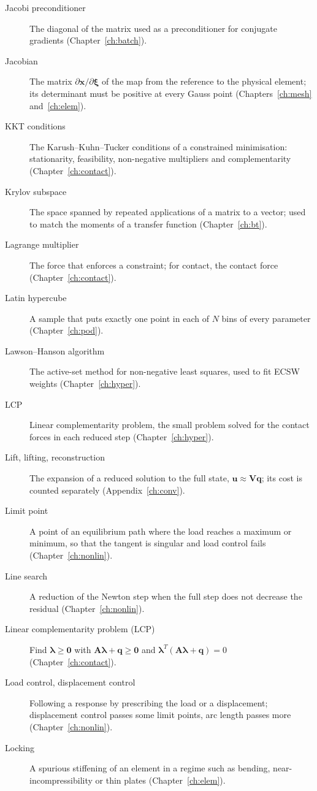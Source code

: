 \begin{description}
\item[Jacobi preconditioner] The diagonal of the matrix used as a preconditioner for conjugate gradients (Chapter~\ref{ch:batch}).
\item[Jacobian] The matrix $\partial\bm x/\partial\bm\xi$ of the map from the reference to the physical element; its determinant must be positive at every Gauss point (Chapters~\ref{ch:mesh} and~\ref{ch:elem}).
\item[KKT conditions] The Karush--Kuhn--Tucker conditions of a constrained minimisation: stationarity, feasibility, non-negative multipliers and complementarity (Chapter~\ref{ch:contact}).
\item[Krylov subspace] The space spanned by repeated applications of a matrix to a vector; used to match the moments of a transfer function (Chapter~\ref{ch:bt}).
\item[Lagrange multiplier] The force that enforces a constraint; for contact, the contact force (Chapter~\ref{ch:contact}).
\item[Latin hypercube] A sample that puts exactly one point in each of $N$ bins of every parameter (Chapter~\ref{ch:pod}).
\item[Lawson--Hanson algorithm] The active-set method for non-negative least squares, used to fit ECSW weights (Chapter~\ref{ch:hyper}).
\item[LCP] Linear complementarity problem, the small problem solved for the contact forces in each reduced step (Chapter~\ref{ch:hyper}).
\item[Lift, lifting, reconstruction] The expansion of a reduced solution to the full state, $\bm u\approx\bm V\bm q$; its cost is counted separately (Appendix~\ref{ch:conv}).
\item[Limit point] A point of an equilibrium path where the load reaches a maximum or minimum, so that the tangent is singular and load control fails (Chapter~\ref{ch:nonlin}).
\item[Line search] A reduction of the Newton step when the full step does not decrease the residual (Chapter~\ref{ch:nonlin}).
\item[Linear complementarity problem (LCP)] Find $\bm\lambda\ge\bm0$ with $\bm A\bm\lambda+\bm q\ge\bm0$ and $\bm\lambda^T(\bm A\bm\lambda+\bm q)=0$ (Chapter~\ref{ch:contact}).
\item[Load control, displacement control] Following a response by prescribing the load or a displacement; displacement control passes some limit points, arc length passes more (Chapter~\ref{ch:nonlin}).
\item[Locking] A spurious stiffening of an element in a regime such as bending, near-incompressibility or thin plates (Chapter~\ref{ch:elem}).

\end{description}
